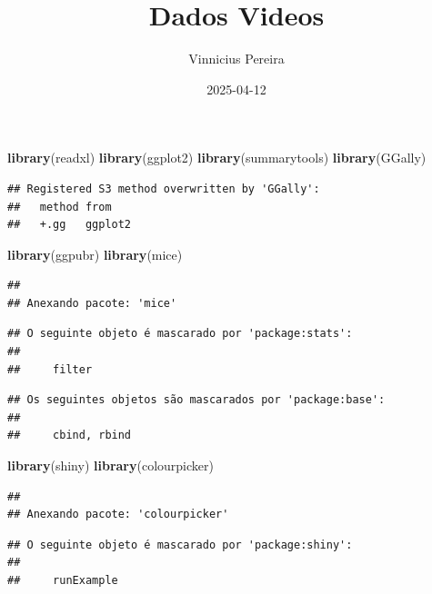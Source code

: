 \documentclass[
]{article}
\title{Dados Videos}
\author{Vinnicius Pereira}
\date{2025-04-12}
\newenvironment{Shaded}{\begin{snugshade}}{\end{snugshade}}
\newcommand{\FunctionTok}[1]{\textcolor[rgb]{0.13,0.29,0.53}{\textbf{#1}}}
\newcommand{\NormalTok}[1]{#1}
\begin{document}
\maketitle

\begin{Shaded}
\begin{Highlighting}[]
\FunctionTok{library}\NormalTok{(readxl)}
\FunctionTok{library}\NormalTok{(ggplot2)}
\FunctionTok{library}\NormalTok{(summarytools)}
\FunctionTok{library}\NormalTok{(GGally)}
\end{Highlighting}
\end{Shaded}

\begin{verbatim}
## Registered S3 method overwritten by 'GGally':
##   method from   
##   +.gg   ggplot2
\end{verbatim}

\begin{Shaded}
\begin{Highlighting}[]
\FunctionTok{library}\NormalTok{(ggpubr)}
\FunctionTok{library}\NormalTok{(mice)}
\end{Highlighting}
\end{Shaded}

\begin{verbatim}
## 
## Anexando pacote: 'mice'
\end{verbatim}

\begin{verbatim}
## O seguinte objeto é mascarado por 'package:stats':
## 
##     filter
\end{verbatim}

\begin{verbatim}
## Os seguintes objetos são mascarados por 'package:base':
## 
##     cbind, rbind
\end{verbatim}

\begin{Shaded}
\begin{Highlighting}[]
\FunctionTok{library}\NormalTok{(shiny)}
\FunctionTok{library}\NormalTok{(colourpicker)}
\end{Highlighting}
\end{Shaded}

\begin{verbatim}
## 
## Anexando pacote: 'colourpicker'
\end{verbatim}

\begin{verbatim}
## O seguinte objeto é mascarado por 'package:shiny':
## 
##     runExample
\end{verbatim}
\end{document}
